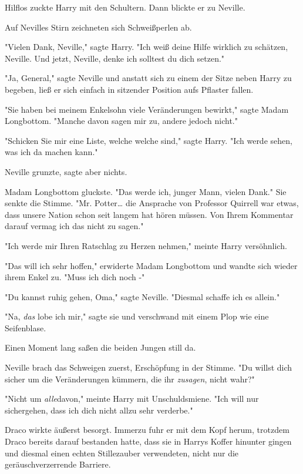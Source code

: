 {Hilflos zuckte Harry mit den Schultern. Dann blickte er zu Neville.

Auf Nevilles Stirn zeichneten sich Schweißperlen ab.

"Vielen Dank, Neville," sagte Harry. "Ich weiß deine Hilfe wirklich zu schätzen, Neville. Und jetzt, Neville, denke ich solltest du dich setzen."

"Ja, General," sagte Neville und anstatt sich zu einem der Sitze neben Harry zu begeben, ließ er sich einfach in sitzender Position aufs Pflaster fallen.

"Sie haben bei meinem Enkelsohn viele Veränderungen bewirkt," sagte Madam Longbottom. "Manche davon sagen mir zu, andere jedoch nicht."

"Schicken Sie mir eine Liste, welche welche sind," sagte Harry. "Ich werde sehen, was ich da machen kann."

Neville grunzte, sagte aber nichts.

Madam Longbottom gluckste. "Das werde ich, junger Mann, vielen Dank." Sie senkte die Stimme. "Mr. Potter… die Ansprache von Professor Quirrell war etwas, dass unsere Nation schon seit langem hat hören müssen. Von Ihrem Kommentar darauf vermag ich das nicht zu sagen."

"Ich werde mir Ihren Ratschlag zu Herzen nehmen," meinte Harry versöhnlich.

"Das will ich sehr hoffen," erwiderte Madam Longbottom und wandte sich wieder ihrem Enkel zu. "Muss ich dich noch -"

"Du kannst ruhig gehen, Oma," sagte Neville. "Diesmal schaffe ich es allein."

"Na, \emph{das} lobe ich mir," sagte sie und verschwand mit einem Plop wie eine Seifenblase.

Einen Moment lang saßen die beiden Jungen still da.

Neville brach das Schweigen zuerst, Erschöpfung in der Stimme. "Du willst dich sicher um die Veränderungen kümmern, die ihr \emph{zusagen}, nicht wahr?"

"Nicht um \emph{alle}davon," meinte Harry mit Unschuldsmiene. "Ich will nur sichergehen, dass ich dich nicht allzu sehr verderbe."

\later

Draco wirkte äußerst besorgt. Immerzu fuhr er mit dem Kopf herum, trotzdem Draco bereits darauf bestanden hatte, dass sie in Harrys Koffer hinunter gingen und diesmal einen echten Stillezauber verwendeten, nicht nur die geräuschverzerrende Barriere.

}
